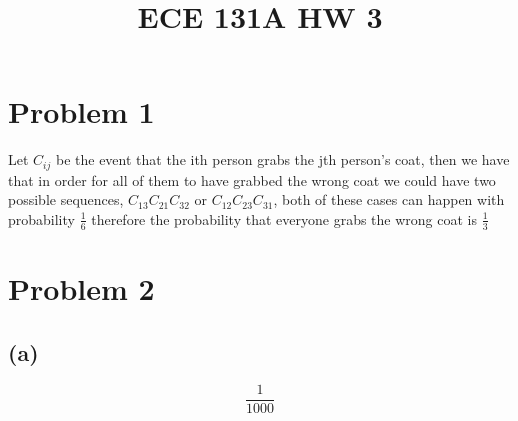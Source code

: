 
\title{ECE 131A HW 3}

\maketitle
\section*{Problem 1}
Let $C_{ij}$ be the event that 
the ith person grabs the jth person's coat, then we have that 
in order for all of them to have grabbed the wrong coat we could
have two possible sequences, 
$C_{13}C_{21}C_{32}$ or $C_{12}C_{23}C_{31}$, both of these cases
can happen with probability $\frac{1}{6}$ therefore the probability
that everyone grabs the wrong coat is $\boxed{\frac{1}{3}}$
\section*{Problem 2}
\subsection*{(a)}
$$\boxed{\frac{1}{1000}}$$


